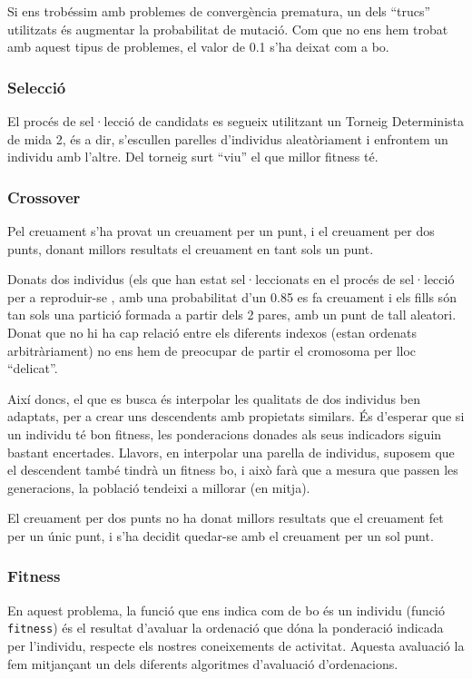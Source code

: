 Si ens trobéssim amb problemes de convergència prematura, un dels ``trucs''
utilitzats és augmentar la probabilitat de mutació.  Com que no ens hem trobat
amb aquest tipus de problemes, el valor de 0.1 s'ha deixat com a bo.

\subsubsection{Selecció} %
\label{ssub:Seleccio}
El procés de sel·lecció de candidats es segueix utilitzant un Torneig
Determinista de mida 2, és a dir, s'escullen parelles d'individus
aleatòriament i enfrontem un individu amb l'altre. Del torneig surt ``viu'' el
que millor fitness té.

\subsubsection{Crossover} %
\label{ssub:Crossover}

Pel creuament s'ha provat un creuament per un punt, i el creuament per dos
punts, donant millors resultats el creuament en tant sols un punt.  

Donats dos individus (els que han estat sel·leccionats en el procés de
sel·lecció per a reproduir-se , amb una probabilitat d'un 0.85 es fa creuament i
els fills són tan sols una partició formada a partir dels 2 pares, amb un punt
de tall aleatori.  Donat que no hi ha cap relació entre els diferents indexos
(estan ordenats arbitràriament) no ens hem de preocupar de partir el cromosoma
per lloc ``delicat''. 

Així doncs, el que es busca és interpolar les qualitats de dos individus ben
adaptats, per a crear uns descendents amb propietats similars.  És d'esperar que
si un individu té bon fitness, les ponderacions donades als seus indicadors
siguin bastant encertades.  Llavors, en interpolar una parella de individus,
suposem que el descendent també tindrà un fitness bo, i això farà que a mesura
que passen les generacions, la població tendeixi a millorar (en mitja).

El creuament per dos punts no ha donat millors resultats que el creuament fet
per un únic punt, i s'ha decidit quedar-se amb el creuament per un sol punt.

\subsubsection{Fitness} %
\label{ssub:PFitness}
En aquest problema, la funció que ens indica com de bo és un individu (funció
\texttt{fitness}) és el resultat d'avaluar la ordenació que dóna la ponderació
indicada per l'individu, respecte els nostres coneixements de activitat. Aquesta
avaluació la fem mitjançant un dels diferents algoritmes d'avaluació d'ordenacions.

